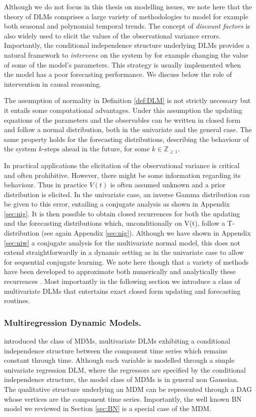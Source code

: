 Although we do not focus in this thesis on modelling issues, we note here that the theory of \glspl{DLM} comprises a large variety of methodologies to model for example both seasonal and polynomial temporal trends. The concept of \textit{discount factors} is also widely used to elicit the values of the observational variance errors. Importantly, the conditional independence structure underlying \glspl{DLM} provides a natural framework to \textit{intervene} on the system by for example changing the value of some of the model's parameters. This strategy is usually implemented when the model has a poor forecasting performance. We discuss below the role of intervention in causal reasoning. 

The assumption of normality in Definition \ref{def:DLM} is not strictly necessary but it entails some computational advantages. Under this assumption the updating equations of the parameters and the observables can be written in closed form and follow a normal distribution, both in the univariate and the general case. The same property holds for the forecasting distributions, describing the behaviour of the system $k$-steps ahead in the future, for some $k\in\mathbb{Z}_{\geq 1}$.

In practical applications the elicitation of the observational variance is critical and often prohibitive. However, there might be some information regarding its behaviour. Thus in practice $V(t)$ is often assumed unknown and a prior distribution is elicited. In the univariate case, an inverse Gamma distribution can be given to this error, entailing a conjugate analysis as shown in Appendix \ref{sec:nig}. It is then possible to obtain closed recurrences for both the updating and the forecasting distributions which, unconditionally on V(t), follow a T-distribution (see again Appendix \ref{sec:nig}). Although we have shown in Appendix \ref{sec:niw} a conjugate analysis for the multivariate normal model, this does not extend straightforwardly in a dynamic setting as in the univariate case to allow for sequential conjugate learning. We note here though that a variety of methods have been developed to approximate both numerically and analytically these recurrences \citep[see][]{Harrison1997}. Most importantly in the following section we introduce a class of multivariate \glspl{DLM} that entertains exact closed form updating and forecasting routines. 
  
\subsubsection{Multiregression Dynamic Models.}
\citet{Queen1993} introduced the class of \glspl{MDM}, multivariate \glspl{DLM} exhibiting a conditional independence structure between the component time series which remains constant through time. Although each variable is modelled through a simple univariate regression \gls{DLM}, where the regressors are specified by the conditional independence structure, the model class of \glspl{MDM} is in general non Gaussian. The qualitative structure underlying an \gls{MDM} can be represented through a \gls{DAG} whose vertices are the component time series. Importantly, the well known \gls{BN} model we reviewed in Section \ref{sec:BN} is a special case of the \gls{MDM}.

